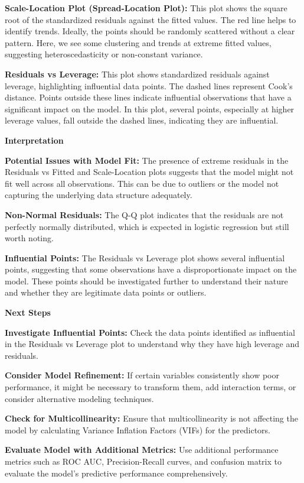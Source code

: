 \documentclass[
]{article}
\begin{document}
\textbf{Scale-Location Plot (Spread-Location Plot):} This plot shows the
square root of the standardized residuals against the fitted values. The
red line helps to identify trends. Ideally, the points should be
randomly scattered without a clear pattern. Here, we see some clustering
and trends at extreme fitted values, suggesting heteroscedasticity or
non-constant variance.

\textbf{Residuals vs Leverage:} This plot shows standardized residuals
against leverage, highlighting influential data points. The dashed lines
represent Cook's distance. Points outside these lines indicate
influential observations that have a significant impact on the model. In
this plot, several points, especially at higher leverage values, fall
outside the dashed lines, indicating they are influential.

\textbf{Interpretation}

\textbf{Potential Issues with Model Fit:} The presence of extreme
residuals in the Residuals vs Fitted and Scale-Location plots suggests
that the model might not fit well across all observations. This can be
due to outliers or the model not capturing the underlying data structure
adequately.

\textbf{Non-Normal Residuals:} The Q-Q plot indicates that the residuals
are not perfectly normally distributed, which is expected in logistic
regression but still worth noting.

\textbf{Influential Points:} The Residuals vs Leverage plot shows
several influential points, suggesting that some observations have a
disproportionate impact on the model. These points should be
investigated further to understand their nature and whether they are
legitimate data points or outliers.

\textbf{Next Steps}

\textbf{Investigate Influential Points:} Check the data points
identified as influential in the Residuals vs Leverage plot to
understand why they have high leverage and residuals.

\textbf{Consider Model Refinement:} If certain variables consistently
show poor performance, it might be necessary to transform them, add
interaction terms, or consider alternative modeling techniques.

\textbf{Check for Multicollinearity:} Ensure that multicollinearity is
not affecting the model by calculating Variance Inflation Factors (VIFs)
for the predictors.

\textbf{Evaluate Model with Additional Metrics:} Use additional
performance metrics such as ROC AUC, Precision-Recall curves, and
confusion matrix to evaluate the model's predictive performance
comprehensively.
\end{document}
